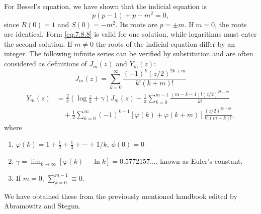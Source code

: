 For Bessel's equation, we have shown that the indicial equation is
\[
p(p-1) + p - m^2 = 0,
\]
since $R(0) = 1$ and $S(0) = -m^2$.  Its roots are $p = \pm m$.  If $m = 0$, the roots are identical.  Form \eqref{eq:7.8.8} is valid for one solution, while logarithms must enter the second solution.  If $m \neq 0$ the roots of the indicial equation differ by an integer.  The following infinite series can be verified by substitution and are often considered as definitions of $J_m(z)$ and $Y_m(z)$:
\begin{equation}
J_m(z) = \sum_{k=0}^{\infty}\frac{(-1)^k(z/2)^{2k+m}}{k!(k+m)!}
\label{eq:7.8.9}
\end{equation}
\begin{equation}
\begin{aligned}
Y_m(z) &= \frac{2}{\pi}\left(\log\frac{z}{2} + \gamma\right)J_m(z) - \frac{1}{\pi}\sum_{k=0}^{m-1}\frac{(m-k-1)!(z/2)^{2k-m}}{k!} \\
&\quad + \frac{1}{2}\sum_{k=0}^{\infty}(-1)^{k+1}\left[\varphi(k) + \varphi(k+m)\right]\frac{(z/2)^{2k+m}}{k!(m+k)!},
\end{aligned}
\label{eq:7.8.10}
\end{equation}
where
\begin{enumerate}
\item[(i)] $\varphi(k) = 1 + \frac{1}{2} + \frac{1}{3} + \cdots + 1/k$, \quad $\phi(0) = 0$
\item[(ii)] $\gamma = \lim_{k\to\infty}[\varphi(k) - \ln k] = 0.5772157\ldots$, known as Euler's constant.
\item[(iii)] If $m = 0$, $\sum_{k=0}^{m-1} \equiv 0$.
\end{enumerate}

We have obtained these from the previously mentioned handbook edited by Abramowitz and Stegun.

